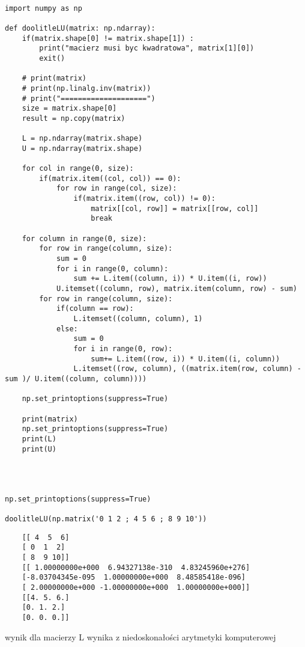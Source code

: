 \begin{verbatim}

import numpy as np 

def doolitleLU(matrix: np.ndarray):
    if(matrix.shape[0] != matrix.shape[1]) :
        print("macierz musi byc kwadratowa", matrix[1][0])
        exit()

    # print(matrix)
    # print(np.linalg.inv(matrix))
    # print("====================")
    size = matrix.shape[0]
    result = np.copy(matrix)

    L = np.ndarray(matrix.shape)
    U = np.ndarray(matrix.shape)

    for col in range(0, size):
        if(matrix.item((col, col)) == 0):
            for row in range(col, size):
                if(matrix.item((row, col)) != 0):
                    matrix[[col, row]] = matrix[[row, col]]
                    break

    for column in range(0, size):
        for row in range(column, size):
            sum = 0
            for i in range(0, column):
                sum += L.item((column, i)) * U.item((i, row))
            U.itemset((column, row), matrix.item(column, row) - sum)    
        for row in range(column, size):
            if(column == row):
                L.itemset((column, column), 1)
            else:
                sum = 0
                for i in range(0, row):
                    sum+= L.item((row, i)) * U.item((i, column))
                L.itemset((row, column), ((matrix.item(row, column) - sum )/ U.item((column, column))))    
    
    np.set_printoptions(suppress=True)

    print(matrix)
    np.set_printoptions(suppress=True)
    print(L)
    print(U)




np.set_printoptions(suppress=True)

doolitleLU(np.matrix('0 1 2 ; 4 5 6 ; 8 9 10'))  
\end{verbatim}

\begin{lstlisting}
	[[ 4  5  6]
	[ 0  1  2]
	[ 8  9 10]]
	[[ 1.00000000e+000  6.94327138e-310  4.83245960e+276]
	[-8.03704345e-095  1.00000000e+000  8.48585418e-096]
	[ 2.00000000e+000 -1.00000000e+000  1.00000000e+000]]
	[[4. 5. 6.]
	[0. 1. 2.]
	[0. 0. 0.]]
\end{lstlisting}

wynik dla macierzy L wynika z niedoskonałości arytmetyki komputerowej


